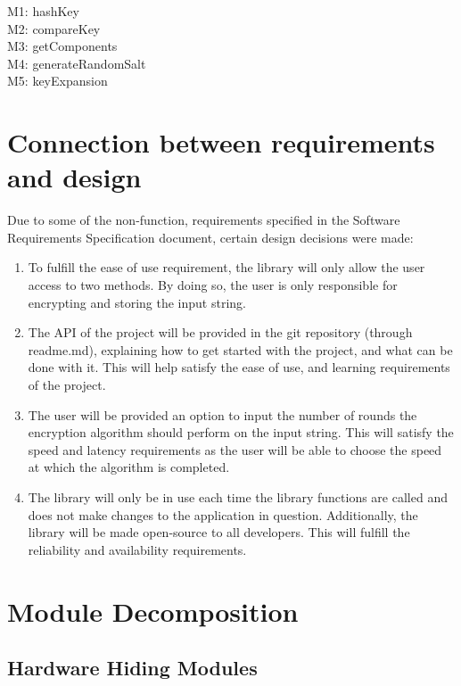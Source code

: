 \documentclass[12pt]{article}
\begin{document}
M1: hashKey \\
M2: compareKey \\
M3: getComponents \\
M4: generateRandomSalt \\
M5: keyExpansion \\




\section{Connection between requirements and design}

	Due to some of the non-function, requirements specified in the Software Requirements Specification document, certain design decisions were made:

	\begin{enumerate}
		\item To fulfill the ease of use requirement, the library will only allow the user access to two methods. By doing so, the user is only responsible for encrypting and storing the input string.
		\item The API of the project will be provided in the git repository (through readme.md), explaining how to get started with the project, and what can be done with it. This will help satisfy the ease of use, and learning requirements of the project.
		\item The user will be provided an option to input the number of rounds the encryption algorithm should perform on the input string. This will satisfy the speed and latency requirements as the user will be able to choose the speed at which the algorithm is completed.
		\item The library will only be in use each time the library functions are called and does not make changes to the application in question. Additionally, the library will be made open-source to all developers. This will fulfill the reliability and availability requirements.


	\end{enumerate}

\section{Module Decomposition}

\subsection{Hardware Hiding Modules}
\end{document}
